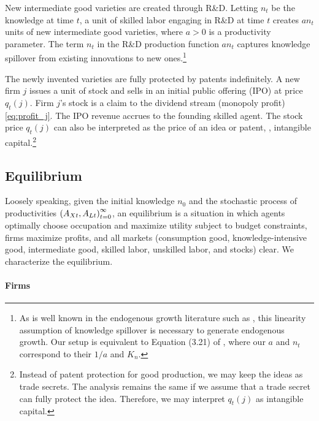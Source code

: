 \documentclass[a4paper,12pt]{article}
\numberwithin{equation}{section}
\theoremstyle{plain}
\begin{document}
New intermediate good varieties are created through R\&D. Letting $n_t$ be the knowledge at time $t$, a unit of skilled labor engaging in R\&D at time $t$ creates $an_t$ units of new intermediate good varieties, where $a>0$ is a productivity parameter. The term $n_t$ in the R\&D production function $an_t$ captures knowledge spillover from existing innovations to new ones.\footnote{As is well known in the endogenous growth literature such as \citet{Romer1990}, this linearity assumption of knowledge spillover is necessary to generate endogenous growth. Our setup is equivalent to Equation (3.21) of \citet[p.~58]{GrossmanHelpman1991book}, where our $a$ and $n_t$ correspond to their $1/a$ and $K_n$.}

The newly invented varieties are fully protected by patents indefinitely. A new firm $j$ issues a unit of stock and sells in an initial public offering (IPO) at price $q_t(j)$. Firm $j$'s stock is a claim to the dividend stream (monopoly profit) \eqref{eq:profit_j}. The IPO revenue accrues to the founding skilled agent. The stock price $q_t(j)$ can also be interpreted as the price of an idea or patent, \ie, intangible capital.\footnote{Instead of patent protection for good production, we may keep the ideas as trade secrets. The analysis remains the same if we assume that a trade secret can fully protect the idea. Therefore, we may interpret $q_t(j)$ as intangible capital.}

\subsection{Equilibrium}

Loosely speaking, given the initial knowledge $n_0$ and the stochastic process of productivities $\set{(A_{Xt},A_{Lt})}_{t=0}^\infty$, an equilibrium is a situation in which agents optimally choose occupation and maximize utility subject to budget constraints, firms maximize profits, and all markets (consumption good, knowledge-intensive good, intermediate good, skilled labor, unskilled labor, and stocks) clear. We characterize the equilibrium.

\paragraph{Firms}
\end{document}

